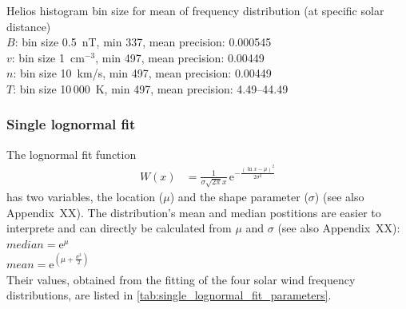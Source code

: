 Helios histogram bin size for mean of frequency distribution (at specific solar distance)\\
$B$: bin size 0.5~nT, min 337, mean precision: 0.000545\\
$v$: bin size 1~cm$^{-3}$, min 497, mean precision: 0.00449\\
$n$: bin size 10~km/s, min 497, mean precision:  0.00449\\
$T$: bin size 10\,000~K, min 497, mean precision: 4.49--44.49\\


\subsubsection{Single lognormal fit}

The lognormal fit function
\begin{align}
	W(x) &= \frac{1}{\sigma \sqrt{2 \pi} x} \, \text{e}^{- \frac{(\ln x - \mu)^2}{2 \sigma^2}}	\label{eq:single_lognormal_fit_function}
\end{align}
has two variables, the location ($\mu$) and the shape parameter ($\sigma$) (see also Appendix~XX). The distribution's mean and median postitions are easier to interprete and can directly be calculated from $\mu$ and $\sigma$ (see also Appendix~XX):\\
$median = \text{e}^\mu$\\
$mean = \text{e}^{\left(\mu + \frac{\sigma^2}{2}\right)}$\\
Their values, obtained from the fitting of the four solar wind frequency distributions, are listed in \autoref{tab:single_lognormal_fit_parameters}.
